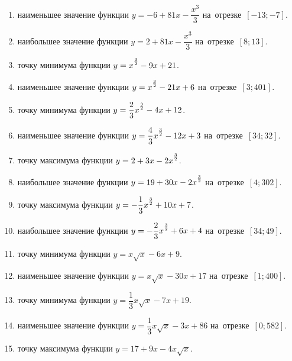 \documentclass[a4paper,10pt]{article}
\begin{document}
\begin{enumerate}
\item {} наименьшее значение функции $y=-6 +81x-\dfrac{x^3}{3}$ на~отрезке~$\left[-13;-7\right]$.

\item {} наибольшее значение функции $y=2 +81x-\dfrac{x^3}{3}$ на~отрезке~$\left[8;13\right]$.

\item {} точку минимума функции $y=x\strut^{\frac{3}{2}} -9x+21$.

\item {} наименьшее значение функции $y=x\strut^{\frac{3}{2}} -21x+6$ на~отрезке~$\left[3;401\right]$.

\item {} точку минимума функции $y=\dfrac{2}{3}x\strut^{\frac{3}{2}} -4x+12$.

\item {} наименьшее значение функции $y=\dfrac{4}{3}x\strut^{\frac{3}{2}} -12x+3$ на~отрезке~$\left[34;32\right]$.

\item {} точку максимума функции $y=2+3x-2x\strut^{\frac{3}{2}}$.

\item {} наибольшее значение функции $y=19+30x-2x\strut^{\frac{3}{2}}$ на~отрезке~$\left[4;302\right]$.

\item {} точку максимума функции $y=-\dfrac{1}{3}x\strut^{\frac{3}{2}} +10x+7$.

\item {} наибольшее значение функции $y=-\dfrac{2}{3}x\strut^{\frac{3}{2}} +6x+4$ на~отрезке~$\left[34;49\right]$.

\item {} точку минимума функции $y=x\sqrt{x} -6x+9$.

\item {} наименьшее значение функции $y=x\sqrt{x} -30x+17$ на~отрезке~$\left[1;400\right]$.

\item {} точку минимума функции $y=\dfrac{1}{3}x\sqrt{x} -7x+19$.

\item {} наименьшее значение функции $y=\dfrac{1}{3}x\sqrt{x} -3x+86$ на~отрезке~$\left[0;582\right]$.

\item {} точку максимума функции $y=17+9x -4x\sqrt{x}$.


\end{enumerate}
\end{document}
